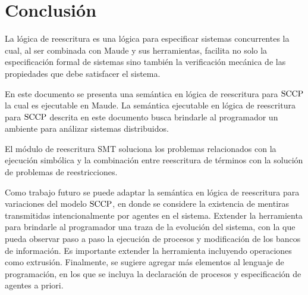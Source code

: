 
\chapter{Conclusi\'on}
\label{c.conclu}

La l\'ogica de reescritura es una l\'ogica para especificar sistemas concurrentes la cual, al ser combinada con Maude y sus herramientas, facilita no solo la especificaci\'on formal de sistemas sino tambi\'en la verificaci\'on mec\'anica de las propiedades que debe satisfacer el sistema.

En este documento se presenta una sem\'antica en l\'ogica de reescritura para $\textnormal{SCCP}$ la cual es ejecutable en Maude. La sem\'antica ejecutable en l\'ogica de reescritura para $\textnormal{SCCP}$ descrita en este documento busca brindarle al programador un ambiente para an\'alizar sistemas distribuidos. 

El m\'odulo de reescritura SMT soluciona los problemas relacionados con la ejecuci\'on simb\'olica y la combinaci\'on entre reescritura de t\'erminos con la soluci\'on de problemas de reestricciones.

Como trabajo futuro se puede adaptar la sem\'antica en l\'ogica de reescritura para variaciones del modelo $\textnormal{SCCP}$, en donde se considere la existencia de mentiras transmitidas intencionalmente por agentes en el sistema. Extender la herramienta para brindarle al programador una traza de la evoluci\'on del sistema, con la que pueda observar paso a paso la ejecuci\'on de procesos y modificaci\'on de los bancos de informaci\'on. Es importante extender la herramienta incluyendo operaciones como extrusi\'on. Finalmente, se sugiere agregar m\'as elementos al lenguaje de programaci\'on, en los que se incluya la declaraci\'on de procesos y especificaci\'on de agentes a priori. 